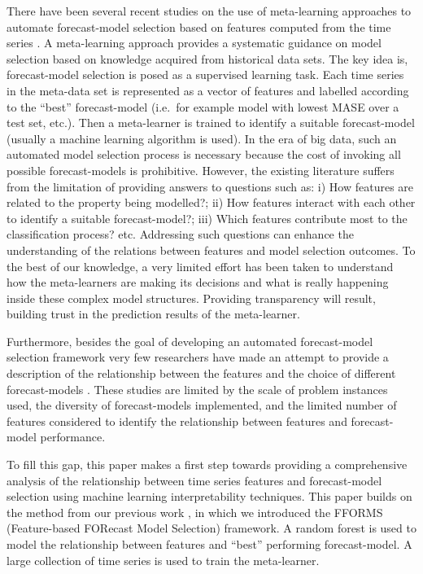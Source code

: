 \documentclass[11pt,a4paper,]{article}
\begin{document}
There have been several recent studies on the use of meta-learning
approaches to automate forecast-model selection based on features
computed from the time series
\autocites{shah1997model}{prudencio2004meta}{lemke2010meta}{kuck2016meta}.
A meta-learning approach provides a systematic guidance on model
selection based on knowledge acquired from historical data sets. The key
idea is, forecast-model selection is posed as a supervised learning
task. Each time series in the meta-data set is represented as a vector
of features and labelled according to the ``best'' forecast-model
(i.e.~for example model with lowest MASE over a test set, etc.). Then a
meta-learner is trained to identify a suitable forecast-model (usually a
machine learning algorithm is used). In the era of big data, such an
automated model selection process is necessary because the cost of
invoking all possible forecast-models is prohibitive. However, the
existing literature suffers from the limitation of providing answers to
questions such as: i) How features are related to the property being
modelled?; ii) How features interact with each other to identify a
suitable forecast-model?; iii) Which features contribute most to the
classification process? etc. Addressing such questions can enhance the
understanding of the relations between features and model selection
outcomes. To the best of our knowledge, a very limited effort has been
taken to understand how the meta-learners are making its decisions and
what is really happening inside these complex model structures.
Providing transparency will result, building trust in the prediction
results of the meta-learner.

Furthermore, besides the goal of developing an automated forecast-model
selection framework very few researchers have made an attempt to provide
a description of the relationship between the features and the choice of
different forecast-models
\autocites{schnaars1984situational}{wang2009rule}{lemke2010meta}[ are
among some exceptions]{petropoulos2014horses}. These studies are limited
by the scale of problem instances used, the diversity of forecast-models
implemented, and the limited number of features considered to identify
the relationship between features and forecast-model performance.

To fill this gap, this paper makes a first step towards providing a
comprehensive analysis of the relationship between time series features
and forecast-model selection using machine learning interpretability
techniques. This paper builds on the method from our previous work
\textcite{fforms}, in which we introduced the FFORMS (Feature-based
FORecast Model Selection) framework. A random forest is used to model
the relationship between features and ``best'' performing
forecast-model. A large collection of time series is used to train the
meta-learner.
\end{document}
